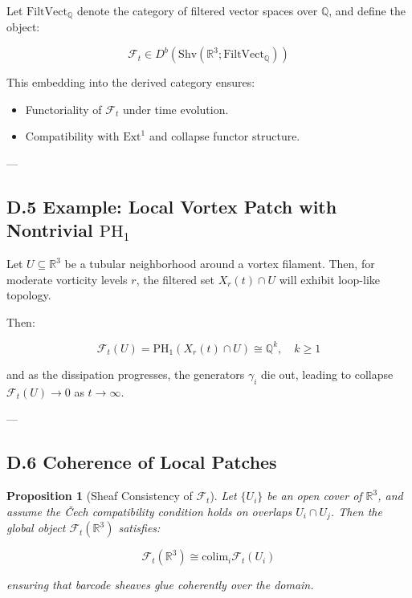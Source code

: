 \documentclass[11pt]{article}
\newtheorem{proposition}[theorem]{Proposition}
\begin{document}
Let \( \mathrm{FiltVect}_\mathbb{Q} \) denote the category of filtered vector spaces over \( \mathbb{Q} \),  
and define the object:

\[
\mathcal{F}_t \in D^b(\mathrm{Shv}(\mathbb{R}^3; \mathrm{FiltVect}_\mathbb{Q}))
\]

This embedding into the derived category ensures:

\begin{itemize}
  \item Functoriality of \( \mathcal{F}_t \) under time evolution.
  \item Compatibility with \( \mathrm{Ext}^1 \) and collapse functor structure.
\end{itemize}

---

\subsection*{D.5 Example: Local Vortex Patch with Nontrivial \( \mathrm{PH}_1 \)}

Let \( U \subseteq \mathbb{R}^3 \) be a tubular neighborhood around a vortex filament.  
Then, for moderate vorticity levels \( r \), the filtered set \( X_r(t) \cap U \) will exhibit  
loop-like topology.

Then:

\[
\mathcal{F}_t(U) = \mathrm{PH}_1(X_r(t) \cap U) \cong \mathbb{Q}^k,\quad k \ge 1
\]

and as the dissipation progresses, the generators \( \gamma_i \) die out,  
leading to collapse \( \mathcal{F}_t(U) \to 0 \) as \( t \to \infty \).

---

\subsection*{D.6 Coherence of Local Patches}

\begin{proposition}[Sheaf Consistency of \( \mathcal{F}_t \)]
Let \( \{ U_i \} \) be an open cover of \( \mathbb{R}^3 \), and assume the Čech compatibility condition holds  
on overlaps \( U_i \cap U_j \). Then the global object \( \mathcal{F}_t(\mathbb{R}^3) \) satisfies:

\[
\mathcal{F}_t(\mathbb{R}^3) \cong \mathrm{colim}_i \mathcal{F}_t(U_i)
\]

ensuring that barcode sheaves glue coherently over the domain.
\end{proposition}
\end{document}
